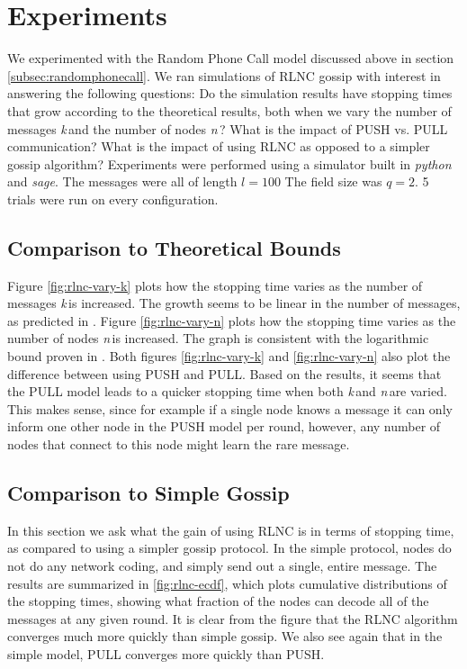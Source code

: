 \documentclass{article} %
\def\numNodes{\textit{n}\,}
\def\numMessages{\textit{k}\,}
\begin{document}
\section{Experiments}
We experimented with the Random Phone Call model discussed above in section \ref{subsec:randomphonecall}. We ran simulations of RLNC gossip with interest in answering the following questions: Do the simulation results have stopping times that grow according to the theoretical results, both when we vary the number of messages \numMessages and the number of nodes \numNodes? What is the impact of PUSH vs. PULL communication? What is the impact of using RLNC as opposed to a simpler gossip algorithm? Experiments were performed using a simulator built in \textit{python} and \textit{sage}\cite{sage}. The messages were all of length $l=100$ The field size was $q=2$. 5 trials were run on every configuration.
\subsection{Comparison to Theoretical Bounds}
Figure \ref{fig:rlnc-vary-k} plots how the stopping time varies as the number of messages \numMessages is increased. The growth seems to be linear in the number of messages, as predicted in \cite{haeupler2011analyzing}. Figure \ref{fig:rlnc-vary-n} plots how the stopping time varies as the number of nodes \numNodes is increased. The graph is consistent with the logarithmic bound proven in \cite{haeupler2011analyzing}. Both figures \ref{fig:rlnc-vary-k} and \ref{fig:rlnc-vary-n} also plot the difference between using PUSH and PULL. Based on the results, it seems that the PULL model leads to a quicker stopping time when both \numMessages and \numNodes are varied. This makes sense, since for example if a single node knows a message it can only inform one other node in the PUSH model per round, however, any number of nodes that connect to this node might learn the rare message.

\subsection{Comparison to Simple Gossip}
In this section we ask what the gain of using RLNC is in terms of stopping time, as compared to using a simpler gossip protocol. In the simple protocol, nodes do not do any network coding, and simply send out a single, entire message. The results are summarized in \ref{fig:rlnc-ecdf}, which plots cumulative distributions of the stopping times, showing what fraction of the nodes can decode all of the messages at any given round. It is clear from the figure that the RLNC algorithm converges much more quickly than simple gossip. We also see again that in the simple model, PULL converges more quickly than PUSH.
\end{document}
